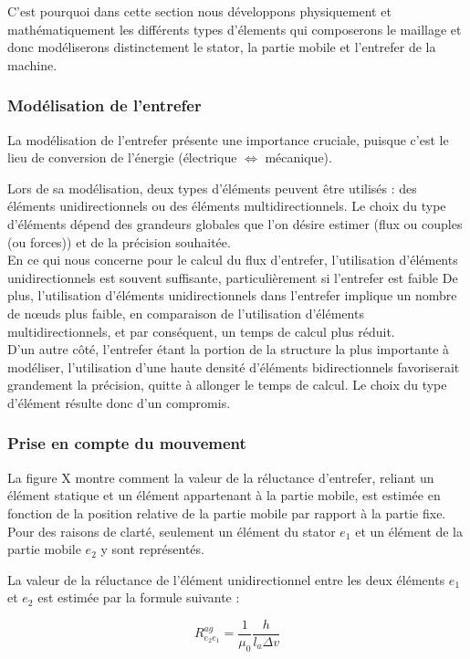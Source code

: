 C'est pourquoi dans cette section nous développons physiquement et mathématiquement les différents types d'élements qui composerons le maillage et donc modéliserons distinctement le stator, la partie mobile et l'entrefer de la machine.

\subsubsection{Modélisation de l'entrefer}
La modélisation de l’entrefer présente une importance cruciale, puisque c’est le lieu de
conversion de l’énergie (électrique $\iff$ mécanique).

Lors de sa modélisation, deux types d’éléments peuvent être utilisés : des
éléments unidirectionnels ou des
éléments multidirectionnels. Le choix du type d’éléments dépend des grandeurs globales que l’on désire
estimer (flux ou couples (ou forces)) et de la précision souhaitée.\\
En ce qui nous concerne pour le calcul du
flux d’entrefer, l’utilisation d’éléments unidirectionnels est souvent suffisante,
particulièrement si l’entrefer est faible De plus, l’utilisation d’éléments unidirectionnels dans
l’entrefer implique un nombre de nœuds plus faible, en comparaison de l’utilisation
d’éléments multidirectionnels, et par conséquent, un temps de calcul plus réduit.\\
D'un autre côté, l'entrefer étant la portion de la structure la plus importante à modéliser, l'utilisation d'une haute densité d'éléments bidirectionnels favoriserait grandement la précision, quitte à allonger le temps de calcul. Le choix du type d'élément résulte donc d'un compromis.

\subsubsection*{Prise en compte du mouvement}

La figure X  montre comment la valeur de la réluctance
d’entrefer, reliant un élément statique et un élément appartenant à la partie mobile, est estimée
en fonction de la position relative de la partie mobile par rapport à la partie fixe. Pour des
raisons de clarté, seulement un élément du stator $e_1$ et un élément de la partie mobile $e_2$ y sont
représentés.

La valeur de la réluctance de l’élément unidirectionnel entre les deux éléments $e_1$ et $e_2$ est
estimée par la formule suivante :

\begin{equation}
    R_{e_2e_1}^{ag} = \frac{1}{\mu_0}\frac{h}{l_a\Delta v}
\end{equation}

